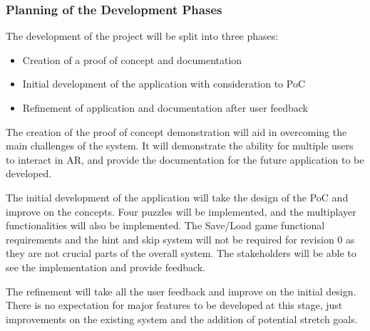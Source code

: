 \documentclass[12pt]{article}
\begin{document}

\subsubsection{Planning of the Development Phases}
The development of the project will be split into three phases:
\begin{itemize}
    \item Creation of a proof of concept and documentation
    \item Initial development of the application with consideration to PoC
    \item Refinement of application and documentation after user feedback
\end{itemize}
The creation of the proof of concept demonstration will aid in overcoming the main challenges of the system. It will demonstrate the ability for multiple users to interact in AR, and provide the documentation for the future application to be developed.

The initial development of the application will take the design of the PoC and improve on the concepts. Four puzzles will be implemented, and the multiplayer functionalities will also be implemented. The Save/Load game functional requirements and the hint and skip system will not be required for revision 0 as they are not crucial parts of the overall system. The stakeholders will be able to see the implementation and provide feedback. 

The refinement will take all the user feedback and improve on the initial design. There is no expectation for major features to be developed at this stage, just improvements on the existing system and the addition of potential stretch goals. 
\end{document}
